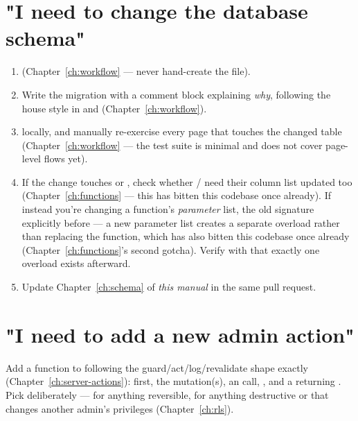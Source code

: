 \section{"I need to change the database schema"}
\begin{enumerate}
  \item {} (Chapter~\ref{ch:workflow} — never hand-create the file).
  \item Write the migration with a comment block explaining \emph{why}, following the house style in  and  (Chapter~\ref{ch:workflow}).
  \item {} locally, and manually re-exercise every page that touches the changed table (Chapter~\ref{ch:workflow} — the test suite is minimal and does not cover page-level flows yet).
  \item If the change touches  or , check whether / need their  column list updated too (Chapter~\ref{ch:functions} — this has bitten this codebase once already). If instead you're changing a function's \emph{parameter} list,  the old signature explicitly before  — a new parameter list creates a separate overload rather than replacing the function, which has also bitten this codebase once already (Chapter~\ref{ch:functions}'s second  gotcha). Verify with  that exactly one overload exists afterward.
  \item Update Chapter~\ref{ch:schema} of \emph{this manual} in the same pull request.
\end{enumerate}

\section{"I need to add a new admin action"}
Add a function to  following the guard/act/log/revalidate shape exactly (Chapter~\ref{ch:server-actions}):  first, the mutation(s), an  call, , and a  returning . Pick  deliberately —  for anything reversible,  for anything destructive or that changes another admin's privileges (Chapter~\ref{ch:rls}).

